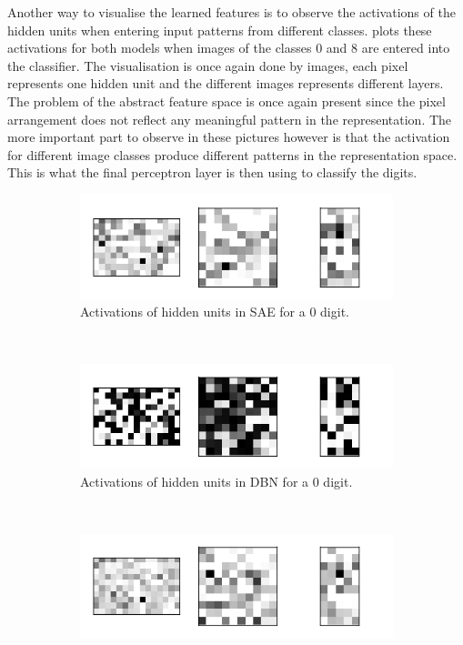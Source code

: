 \documentclass{article}
\begin{document}
Another way to visualise the learned features is to observe the activations of the hidden units
when entering input patterns from different classes.
 plots these activations for both models
when images of the classes 0 and 8 are entered into the classifier.
The visualisation is once again done by images,
each pixel represents one hidden unit
and the different images represents different layers.
The problem of the abstract feature space is once again present
since the pixel arrangement does not reflect any meaningful pattern in the representation.
The more important part to observe in these pictures however is that the activation for different image classes
produce different patterns in the representation space. This is what the final perceptron layer is then using to classify the digits.
\begin{figure}[!ht]
  \centering
  \begin{subfigure}[t]{0.47\textwidth}
    \centering
    \includegraphics[width=\textwidth]{../plots/3_2_2/sae_d0_activations.png}
    \caption{Activations of hidden units in SAE for a 0 digit.}
    \label{fig:saeactivation0}
  \end{subfigure}
  ~
  \begin{subfigure}[t]{0.47\textwidth}
    \centering
    \includegraphics[width=\textwidth]{../plots/3_2_2/dbn_d0_activations.png}
    \caption{Activations of hidden units in DBN for a 0 digit.}
    \label{fig:bdnactivation0}
  \end{subfigure}
  ~
  \begin{subfigure}[t]{0.47\textwidth}
    \centering
    \includegraphics[width=\textwidth]{../plots/3_2_2/sae_d8_activations.png}

\end{subfigure}
\end{figure}
\end{document}
